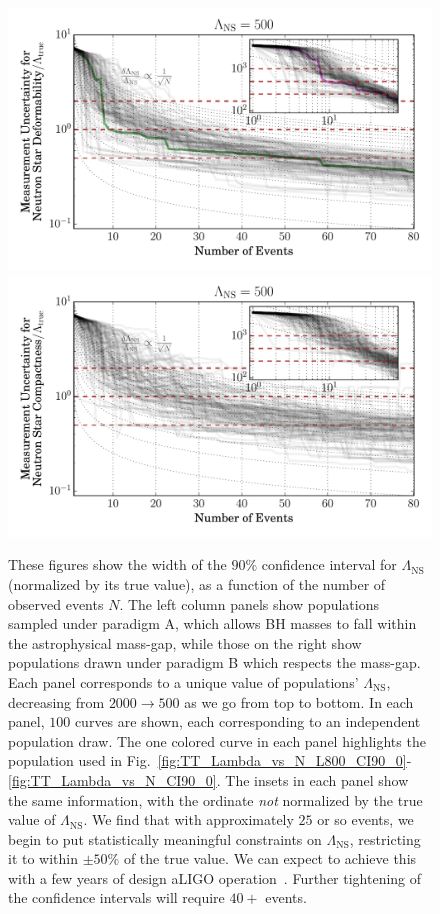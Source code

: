 \documentclass[aps,prd,amsmath,floats,floatfix, twocolumn,
superscriptaddress,nofootinbib,showpacs]{revtex4-1}
\newcommand{\lambdans}{\Lambda_\mathrm{NS}}
\begin{document}
\begin{figure}
\includegraphics[width=0.8\columnwidth]{plots/LambdaCIWidths_vs_N_AllPopulations_Log_L500.pdf}
\includegraphics[width=0.8\columnwidth]{plots/LambdaCIWidths_vs_N_AstroPopulations_Log_L500.pdf}
\caption{%
These figures show the width of the $90\%$ confidence interval for $\lambdans$
(normalized by its true value), as a function of the number of observed events
$N$. The left column panels show populations sampled under paradigm A, which
allows BH masses to fall within the astrophysical mass-gap, while those on the
right show populations drawn under paradigm B which respects the mass-gap.
Each panel corresponds to a unique value of populations' $\lambdans$,
decreasing from $2000\rightarrow 500$ as we go from top to bottom. In each panel,
$100$ curves are shown, each corresponding to an independent population draw. The
one colored curve in each panel highlights the population used in
Fig.~\ref{fig:TT_Lambda_vs_N_L800_CI90_0}-\ref{fig:TT_Lambda_vs_N_CI90_0}.
The insets in each panel show the same information, with the ordinate {\it not}
normalized by the true value of $\lambdans$.
% 
We find that with approximately $25$ or so events, we begin to put
statistically meaningful constraints on $\lambdans$, restricting it to within
$\pm 50\%$ of the true value. We can expect to achieve this with a few years
of design aLIGO operation~\cite{Abadie:2010cfa}. Further tightening of the
confidence intervals will require $40+$ events.
}
\label{fig:TT_LambdaError_vs_N_L500_2000_CI90_0_AllInOne}
\end{figure}
\end{document}
